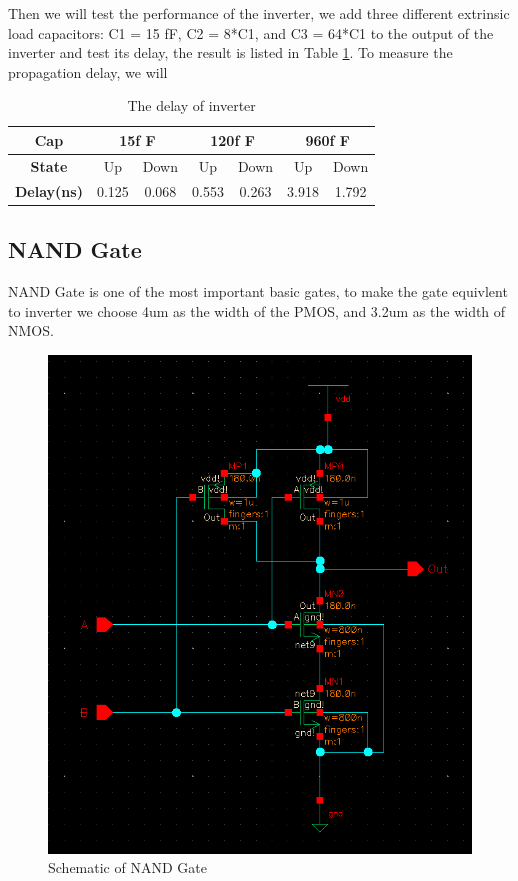 \documentclass[conference]{IEEEtran}
\begin{document}
Then we will test the performance of the inverter, we add three different extrinsic load capacitors: C1 = 15 fF, C2 = 8*C1, and C3 = 64*C1 to the output of the inverter and test its delay, the result is listed in Table \ref{The delay of inverter}. To measure the propagation delay, we will 

\begin{table}[h]
    \caption{The delay of inverter}
    \begin{center}
        \begin{tabular}{|c|c|c|c|c|c|c|}
            \hline
            \textbf{Cap} & \multicolumn{2}{|c|}{15f F} & \multicolumn{2}{|c|}{120f F} & \multicolumn{2}{|c|}{960f F} \\
            \hline
            \textbf{State} & Up & Down & Up & Down & Up & Down \\
            \hline
           
            \textbf{Delay(ns)} & 0.125 & 0.068 & 0.553 & 0.263 & 3.918 & 1.792 \\
            \hline
        \end{tabular}
    \end{center}
    \label{The delay of inverter}
\end{table}

\subsection{NAND Gate}

NAND Gate is one of the most important basic gates, to make the gate equivlent to inverter we choose 4um as the width of the PMOS, and 3.2um as the width of NMOS.

\begin{figure}[H]
    \centering
    \includegraphics[width = 0.7\linewidth]{nand2_schematic.png}
    \caption{Schematic of NAND Gate}
    \label{Schematic of NAND Gate}
\end{figure}
\end{document}
